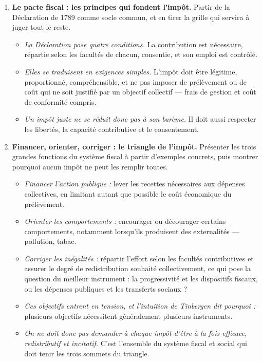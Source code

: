 \documentclass[11pt,a4paper]{article}
\newenvironment{chapitres}[1]
{\begin{enumerate}[leftmargin=1.6em,itemsep=0.15em,parsep=0pt,topsep=0.20em,start=#1]}
{\end{enumerate}}
\newenvironment{args}
{\begin{itemize}[leftmargin=1.1em,itemsep=0.1em,parsep=0pt,topsep=0.12em,label=\textbullet]}
{\end{itemize}}
\begin{document}
\begin{chapitres}{1}
\item \textbf{Le pacte fiscal : les principes qui fondent l'impôt.} Partir de la Déclaration de 1789
comme socle commun, et en tirer la grille qui servira à juger tout le reste.
\begin{args}
\item \emph{La Déclaration pose quatre conditions.} La contribution est nécessaire, répartie selon
les facultés de chacun, consentie, et son emploi est contrôlé.
\item \emph{Elles se traduisent en exigences simples.} L'impôt doit être légitime, proportionné,
compréhensible, et ne pas imposer de prélèvement ou de coût qui ne soit justifié par un objectif
collectif --- frais de gestion et coût de conformité compris.
\item \emph{Un impôt juste ne se réduit donc pas à son barème.} Il doit aussi respecter les
libertés, la capacité contributive et le consentement.
\end{args}
\item \textbf{Financer, orienter, corriger : le triangle de l'impôt.} Présenter les trois grandes
fonctions du système fiscal à partir d'exemples concrets, puis montrer pourquoi aucun impôt ne peut
les remplir toutes.
\begin{args}
\item \emph{Financer l'action publique :} lever les recettes nécessaires aux dépenses collectives, en
limitant autant que possible le coût économique du prélèvement.
\item \emph{Orienter les comportements :} encourager ou décourager certains comportements, notamment
lorsqu'ils produisent des externalités --- pollution, tabac.
\item \emph{Corriger les inégalités :} répartir l'effort selon les facultés contributives et assurer
le degré de redistribution souhaité collectivement, ce qui pose la question du meilleur instrument :
la progressivité et les dispositifs fiscaux, ou les dépenses publiques et les transferts sociaux ?
\item \emph{Ces objectifs entrent en tension, et l'intuition de Tinbergen dit pourquoi :} plusieurs
objectifs nécessitent généralement plusieurs instruments.
\item \emph{On ne doit donc pas demander à chaque impôt d'être à la fois efficace, redistributif et
incitatif.} C'est l'ensemble du système fiscal et social qui doit tenir les trois sommets du
triangle.
\end{args}

\end{chapitres}
\end{document}
